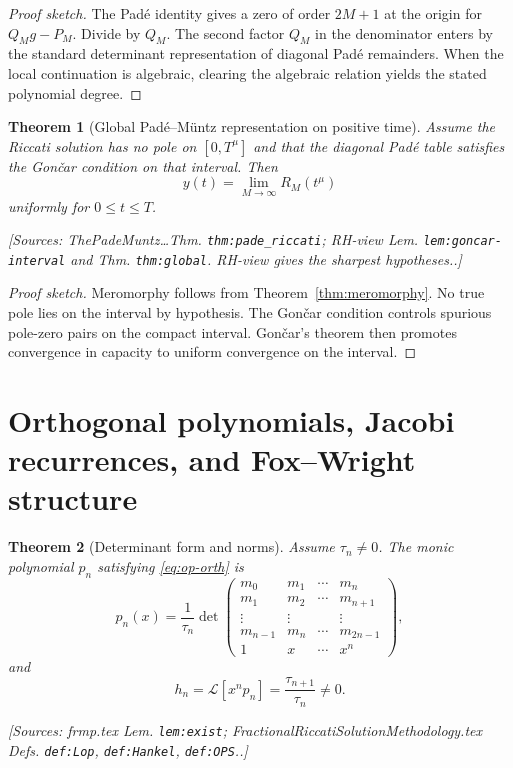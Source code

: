 \documentclass[11pt]{article}
\newtheorem{theorem}{Theorem}[section]
\theoremstyle{definition}
\newcommand{\Lc}{\mathcal{L}}
\newcommand{\Source}[1]{\par\smallskip\noindent\textup{[Sources: #1.]}}
\begin{document}
\begin{proof}[Proof sketch]
The Padé identity gives a zero of order $2M+1$ at the origin for $Q_Mg-P_M$.
Divide by $Q_M$.
The second factor $Q_M$ in the denominator enters by the standard determinant representation of diagonal Padé remainders.
When the local continuation is algebraic,
clearing the algebraic relation yields the stated polynomial degree.
\end{proof}

\begin{theorem}[Global Padé--Müntz representation on positive time]\label{thm:global-positive}
Assume the Riccati solution has no pole on $[0,T^{\mu}]$ and that the diagonal Padé table satisfies the Gončar condition on that interval.
Then
\begin{equation}\label{eq:global-positive}
        y(t)=\lim_{M\to\infty}R_M(t^{\mu})
\end{equation}
uniformly for $0\le t\le T$.
\Source{ThePadeMuntz\ldots Thm. \texttt{thm:pade\_riccati}; RH-view Lem. \texttt{lem:goncar-interval} and Thm. \texttt{thm:global}. RH-view gives the sharpest hypotheses.}
\end{theorem}

\begin{proof}[Proof sketch]
Meromorphy follows from Theorem~\ref{thm:meromorphy}.
No true pole lies on the interval by hypothesis.
The Gončar condition controls spurious pole-zero pairs on the compact interval.
Gončar's theorem then promotes convergence in capacity to uniform convergence on the interval.
\end{proof}

\section{Orthogonal polynomials, Jacobi recurrences, and Fox--Wright structure}

\begin{theorem}[Determinant form and norms]\label{thm:det-op}
Assume $\tau_n\ne0$.
The monic polynomial $p_n$ satisfying \eqref{eq:op-orth} is
\begin{equation}\label{eq:op-det}
        p_n(x)=\frac1{\tau_n}
        \det\begin{pmatrix}
        m_0&m_1&\cdots&m_n\\
        m_1&m_2&\cdots&m_{n+1}\\
        \vdots&\vdots&&\vdots\\
        m_{n-1}&m_n&\cdots&m_{2n-1}\\
        1&x&\cdots&x^n
        \end{pmatrix},
\end{equation}
and
\begin{equation}\label{eq:norm-h}
        h_n=\Lc[x^np_n]=\frac{\tau_{n+1}}{\tau_n}\ne0.
\end{equation}
\Source{frmp.tex Lem. \texttt{lem:exist}; FractionalRiccatiSolutionMethodology.tex Defs. \texttt{def:Lop}, \texttt{def:Hankel}, \texttt{def:OPS}.}
\end{theorem}
\end{document}
